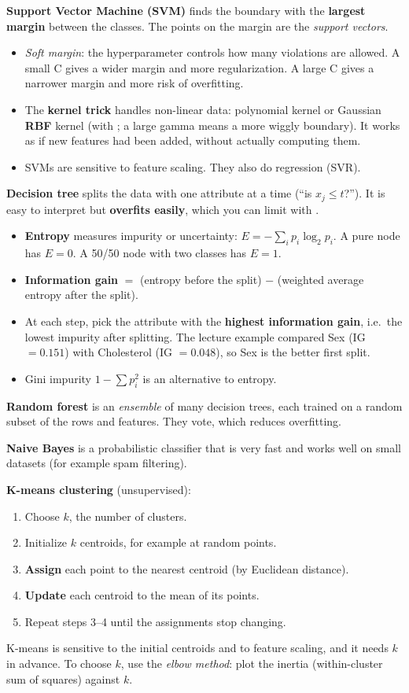\textbf{Support Vector Machine (SVM)} finds the boundary with the \textbf{largest margin} between the classes. The points on the margin are the \emph{support vectors}.
\begin{itemize}
  \item \emph{Soft margin}: the hyperparameter  controls how many violations are allowed. A small C gives a wider margin and more regularization. A large C gives a narrower margin and more risk of overfitting.
  \item The \textbf{kernel trick} handles non-linear data: polynomial kernel or Gaussian \textbf{RBF} kernel (with ; a large gamma means a more wiggly boundary). It works as if new features had been added, without actually computing them.
  \item SVMs are sensitive to feature scaling. They also do regression (SVR).
\end{itemize}

\textbf{Decision tree} splits the data with one attribute at a time (``is $x_j \leq t$?''). It is easy to interpret but \textbf{overfits easily}, which you can limit with .
\begin{itemize}
  \item \textbf{Entropy} measures impurity or uncertainty: $E=-\sum_i p_i\log_2 p_i$. A pure node has $E=0$. A 50/50 node with two classes has $E=1$.
  \item \textbf{Information gain} $=$ (entropy before the split) $-$ (weighted average entropy after the split).
  \item At each step, pick the attribute with the \textbf{highest information gain}, i.e.\ the lowest impurity after splitting. The lecture example compared Sex (IG $=0.151$) with Cholesterol (IG $=0.048$), so Sex is the better first split.
  \item Gini impurity $1-\sum p_i^2$ is an alternative to entropy.
\end{itemize}
\textbf{Random forest} is an \emph{ensemble} of many decision trees, each trained on a random subset of the rows and features. They vote, which reduces overfitting.

\textbf{Naive Bayes} is a probabilistic classifier that is very fast and works well on small datasets (for example spam filtering).

\textbf{K-means clustering} (unsupervised):
\begin{enumerate}
  \item Choose $k$, the number of clusters.
  \item Initialize $k$ centroids, for example at random points.
  \item \textbf{Assign} each point to the nearest centroid (by Euclidean distance).
  \item \textbf{Update} each centroid to the mean of its points.
  \item Repeat steps 3--4 until the assignments stop changing.
\end{enumerate}
K-means is sensitive to the initial centroids and to feature scaling, and it needs $k$ in advance. To choose $k$, use the \emph{elbow method}: plot the inertia (within-cluster sum of squares) against $k$.

